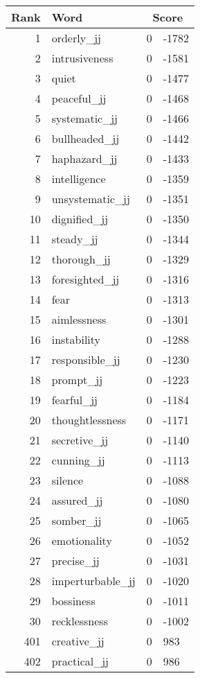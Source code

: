 \begin{longtable}[!htbp]{| rlr@{.}l |}
    \hline
    \textbf{Rank} & \textbf{Word} & \multicolumn{2}{c|}{\textbf{Score}} \\
    \hline
    \endhead
    1 & orderly\_jj & 0 & -1782 \\
    2 & intrusiveness & 0 & -1581 \\
    3 & quiet & 0 & -1477 \\
    4 & peaceful\_jj & 0 & -1468 \\
    5 & systematic\_jj & 0 & -1466 \\
    6 & bullheaded\_jj & 0 & -1442 \\
    7 & haphazard\_jj & 0 & -1433 \\
    8 & intelligence & 0 & -1359 \\
    9 & unsystematic\_jj & 0 & -1351 \\
    10 & dignified\_jj & 0 & -1350 \\
    11 & steady\_jj & 0 & -1344 \\
    12 & thorough\_jj & 0 & -1329 \\
    13 & foresighted\_jj & 0 & -1316 \\
    14 & fear & 0 & -1313 \\
    15 & aimlessness & 0 & -1301 \\
    16 & instability & 0 & -1288 \\
    17 & responsible\_jj & 0 & -1230 \\
    18 & prompt\_jj & 0 & -1223 \\
    19 & fearful\_jj & 0 & -1184 \\
    20 & thoughtlessness & 0 & -1171 \\
    21 & secretive\_jj & 0 & -1140 \\
    22 & cunning\_jj & 0 & -1113 \\
    23 & silence & 0 & -1088 \\
    24 & assured\_jj & 0 & -1080 \\
    25 & somber\_jj & 0 & -1065 \\
    26 & emotionality & 0 & -1052 \\
    27 & precise\_jj & 0 & -1031 \\
    28 & imperturbable\_jj & 0 & -1020 \\
    29 & bossiness & 0 & -1011 \\
    30 & recklessness & 0 & -1002 \\
    401 & creative\_jj & 0 & 983 \\
    402 & practical\_jj & 0 & 986 \\

\end{longtable}
